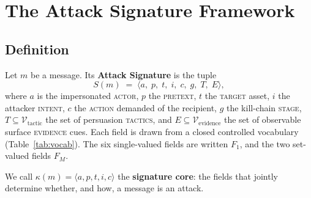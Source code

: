 \documentclass[11pt,a4paper]{article}
\begin{document}
\section{The Attack Signature Framework}
\label{sec:framework}

\subsection{Definition}

Let $m$ be a message. Its \textbf{Attack Signature} is the tuple
\[
  S(m) \;=\; \langle a,\; p,\; t,\; i,\; c,\; g,\; T,\; E \rangle,
\]
where $a$ is the impersonated \textsc{actor}, $p$ the \textsc{pretext},
$t$ the \textsc{target} asset, $i$ the attacker \textsc{intent}, $c$ the
\textsc{action} demanded of the recipient, $g$ the kill-chain \textsc{stage},
$T \subseteq \mathcal{V}_{\text{tactic}}$ the set of persuasion
\textsc{tactics}, and $E \subseteq \mathcal{V}_{\text{evidence}}$ the set of
observable surface \textsc{evidence} cues. Each field is drawn from a closed
controlled vocabulary (Table~\ref{tab:vocab}). The six single-valued fields are
written $F_{1}$, and the two set-valued fields $F_{M}$.

We call $\kappa(m) = \langle a,p,t,i,c \rangle$ the \textbf{signature core}: the
fields that jointly determine whether, and how, a message is an attack.
\end{document}
